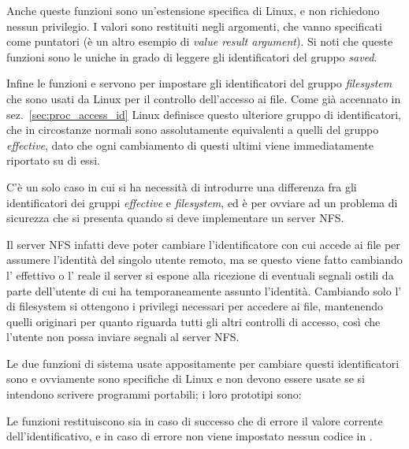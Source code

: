 Anche queste funzioni sono un'estensione specifica di Linux, e non richiedono
nessun privilegio. I valori sono restituiti negli argomenti, che vanno
specificati come puntatori (è un altro esempio di \textit{value result
  argument}). Si noti che queste funzioni sono le uniche in grado di leggere
gli identificatori del gruppo \textit{saved}.

Infine le funzioni  e  servono per impostare gli
identificatori del gruppo \textit{filesystem} che sono usati da Linux per il
controllo dell'accesso ai file.  Come già accennato in
sez.~\ref{sec:proc_access_id} Linux definisce questo ulteriore gruppo di
identificatori, che in circostanze normali sono assolutamente equivalenti a
quelli del gruppo \textit{effective}, dato che ogni cambiamento di questi
ultimi viene immediatamente riportato su di essi.

C'è un solo caso in cui si ha necessità di introdurre una differenza fra gli
identificatori dei gruppi \textit{effective} e \textit{filesystem}, ed è per
ovviare ad un problema di sicurezza che si presenta quando si deve
implementare un server NFS. 

Il server NFS infatti deve poter cambiare l'identificatore con cui accede ai
file per assumere l'identità del singolo utente remoto, ma se questo viene
fatto cambiando l' effettivo o l' reale il server si espone
alla ricezione di eventuali segnali ostili da parte dell'utente di cui ha
temporaneamente assunto l'identità.  Cambiando solo l' di filesystem
si ottengono i privilegi necessari per accedere ai file, mantenendo quelli
originari per quanto riguarda tutti gli altri controlli di accesso, così che
l'utente non possa inviare segnali al server NFS.

Le due funzioni di sistema usate appositamente per cambiare questi
identificatori sono  e  ovviamente sono
specifiche di Linux e non devono essere usate se si intendono scrivere
programmi portabili; i loro prototipi sono:

\begin{funcproto}{ 
}

{Le funzioni restituiscono sia in caso di successo che di errore il valore
  corrente dell'identificativo, e in caso di errore non viene impostato nessun
  codice in .}
\end{funcproto}

